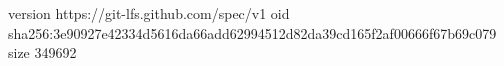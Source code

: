 version https://git-lfs.github.com/spec/v1
oid sha256:3e90927e42334d5616da66add62994512d82da39cd165f2af00666f67b69c079
size 349692
